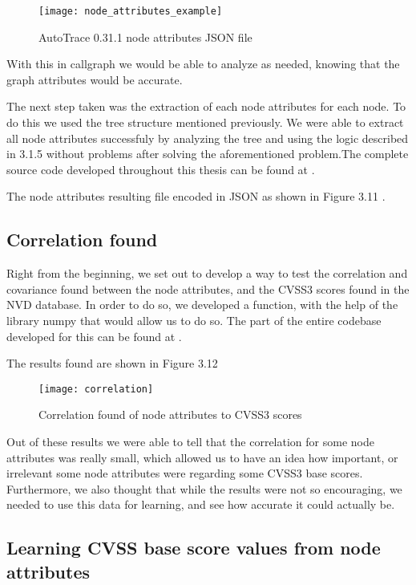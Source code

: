 \begin{figure}[!htb]
	\caption{AutoTrace 0.31.1 node attributes JSON file}
	\centering
	\texttt{[image: node\_attributes\_example]}
\end{figure}

With this in callgraph we would be able to analyze as needed, knowing that the graph attributes would be accurate.

The next step taken was the extraction of each node attributes for each node. To do this we used the tree structure mentioned previously. We were able to extract all node attributes successfuly by analyzing the tree and using the logic described in 3.1.5 without problems after solving the aforementioned problem.The complete source code developed throughout this thesis can be found at \parencite{ricardo} .


The node attributes resulting file encoded in JSON as shown in Figure 3.11 .

\subsection{Correlation found}


Right from the beginning, we set out to develop a way to test the correlation and covariance found between the node attributes, and the CVSS3 scores found in the NVD database. In order to do so, we developed a function, with the help of the library numpy \parencite{numpy} that would allow us to do so. The part of the entire codebase developed for this can be found at \parencite{ricardo} .

The results found are shown in Figure 3.12

\begin{figure}[!htb]
	\caption{Correlation found of node attributes to CVSS3 scores}
	\centering
	\texttt{[image: correlation]}
\end{figure}

Out of these results we were able to tell that the correlation for some node attributes was really small, which allowed us to have an idea how important, or irrelevant some node attributes were regarding some CVSS3 base scores. Furthermore, we also thought that while the results were not so encouraging, we needed to use this data for learning, and see how accurate it could actually be.

\subsection{Learning CVSS base score values from node attributes}

